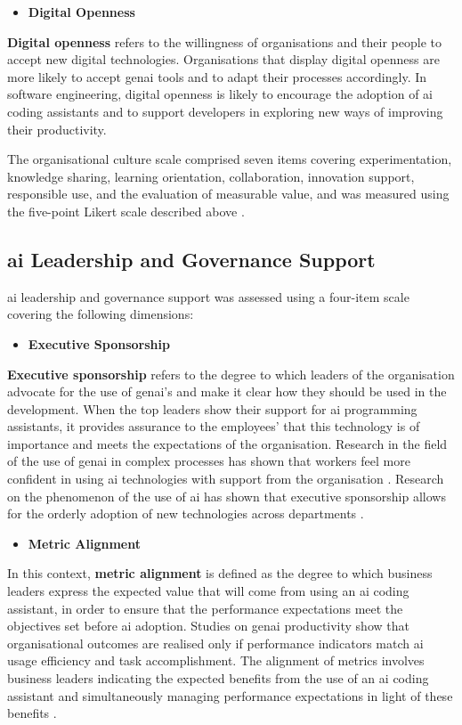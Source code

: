 \begin{itemize}
	\item \textbf{Digital Openness}
\end{itemize}
\textbf{Digital openness} refers to the willingness of organisations and their people to accept new digital technologies. Organisations that display digital openness are more likely to accept \gls{genai} tools and to adapt their processes accordingly. In software engineering, digital openness is likely to encourage the adoption of \gls{ai} coding assistants and to support developers in exploring new ways of improving their productivity.

The organisational culture scale comprised seven items covering experimentation, knowledge sharing, learning orientation, collaboration, innovation support, responsible use, and the evaluation of measurable value, and was measured using the five-point Likert scale described above \autocite{Bryman2016}.

\subsection{\gls{ai} Leadership and Governance Support}
\label{sec:AI Leadership and Governance Support}
\gls{ai} leadership and governance support was assessed using a four-item scale covering the following dimensions:

\begin{itemize}
	\item \textbf{Executive Sponsorship}
\end{itemize}
\textbf{Executive sponsorship} refers to the degree to which leaders of the organisation advocate for the use of \gls{genai}'s and make it clear how they should be used in the development. When the top leaders show their support for \gls{ai} programming assistants, it provides assurance to the employees' that this technology is of importance and meets the expectations of the organisation. Research in the field of the use of \gls{genai} in complex processes has shown that workers feel more confident in using \gls{ai} technologies with support from the organisation \autocite{Noy2023}. Research on the phenomenon of the use of \gls{ai} has shown that executive sponsorship allows for the orderly adoption of new technologies across departments \autocite{Brynjolfsson2025}.

\begin{itemize}
	\item \textbf{Metric Alignment}
\end{itemize}
In this context, \textbf{metric alignment} is defined as the degree to which business leaders express the expected value that will come from using an \gls{ai} coding assistant, in order to ensure that the performance expectations meet the objectives set before \gls{ai} adoption. Studies on \gls{genai} productivity show that organisational outcomes are realised only if performance indicators match \gls{ai} usage efficiency and task accomplishment. The alignment of metrics involves business leaders indicating the expected benefits from the use of an \gls{ai} coding assistant and simultaneously managing performance expectations in light of these benefits \autocite{Noy2023}.

